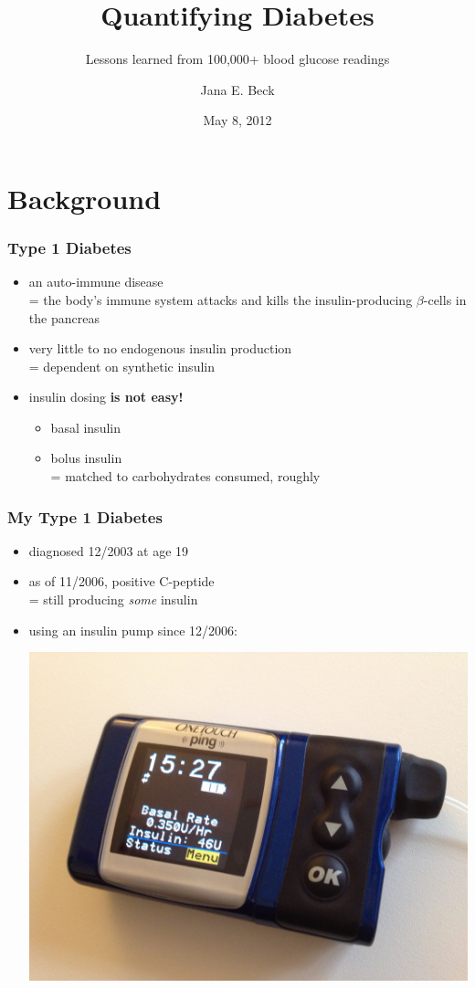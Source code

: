 \documentclass{beamer}
\author{Jana E. Beck}
\title{Quantifying Diabetes}
\subtitle{Lessons learned from 100,000+ blood glucose readings}
\date{May 8, 2012}
\begin{document}
\begin{frame}
\maketitle
\end{frame}

\section{Background}

\begin{frame}
  \frametitle{Type 1 Diabetes}

  \begin{itemize}
  \item an auto-immune disease \pause \\
    = the body's immune system attacks and kills the insulin-producing $\beta$-cells in the
    pancreas
  \pause
  \item very little to no endogenous insulin production \pause \\
    = dependent on synthetic insulin
  \pause
  \item insulin dosing \pause \textbf{is not easy!}
    \begin{itemize}
    \pause
    \item basal insulin
    \pause
    \item bolus insulin \pause \\
      = matched to carbohydrates consumed, roughly
    \end{itemize}
  \end{itemize}

\end{frame}

\begin{frame}
  \frametitle{My Type 1 Diabetes}

  \begin{itemize}
  \item diagnosed 12/2003 at age 19
  \item as of 11/2006, positive C-peptide \pause \\
    = still producing \textit{some} insulin
  \pause
  \item using an insulin pump since 12/2006:
    \begin{center}
      \includegraphics[angle=180,width=.5\linewidth]{ping.jpg}
    \end{center}
  \end{itemize}
  
\end{frame}
\end{document}
